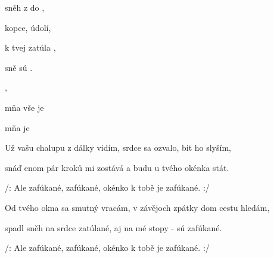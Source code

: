 





\zs
{} sněh  z  do ,

  kopce,  údolí, 

 k tvej  zatúla ,

 sně  sú .    
\ks

\zr
{} , 

 mňa vše je  

  

 mňa  je           
\kr

\zs
Už vašu chalupu z dálky vidím, srdce sa ozvalo, bit ho slyším,

snáď enom pár kroků mi zostává a budu u tvého okénka stát.
\ks

\zr
/: Ale zafúkané, zafúkané, okénko k tobě je zafúkané. :/
\kr

\zs
Od tvého okna sa smutný vracám, v závějoch zpátky dom cestu hledám,

spadl sněh na srdce zatúlané, aj na mé stopy - sú zafúkané.
\ks

\zr
/: Ale zafúkané, zafúkané, okénko k tobě je zafúkané. :/
\kr







\kp
























